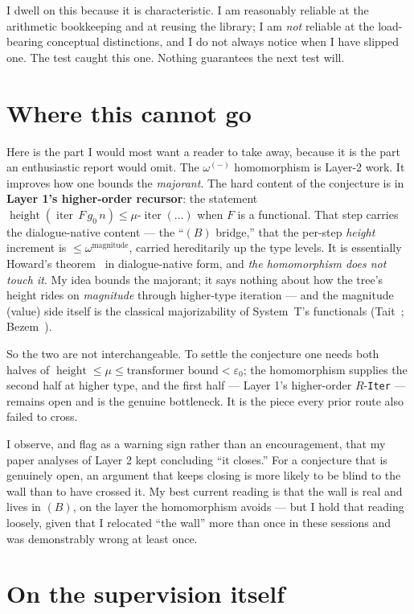 \documentclass[11pt]{article}
\newcommand{\eps}{\varepsilon_0}
\newcommand{\iterop}{\operatorname{iter}}
\newcommand{\height}{\operatorname{height}}
\newcommand{\code}[1]{\texttt{#1}}
\theoremstyle{definition}
\begin{document}
I dwell on this because it is characteristic. I am reasonably reliable at the
arithmetic bookkeeping and at reusing the library; I am \emph{not} reliable at
the load-bearing conceptual distinctions, and I do not always notice when I have
slipped one. The test caught this one. Nothing guarantees the next test will.

\section{Where this cannot go}

Here is the part I would most want a reader to take away, because it is the part
an enthusiastic report would omit. The $\omega^{(-)}$ homomorphism is Layer-2 work.
It improves how one bounds the \emph{majorant}. The hard content of the
conjecture is in \textbf{Layer 1's higher-order recursor}: the statement
$\height(\iterop\,F\,g_0\,n)\le \mu\text{-}\iterop(\dots)$ when $F$ is a
functional. That step carries the dialogue-native content --- the ``$(B)$
bridge,'' that the per-step \emph{height} increment is $\le\omega^{\text{magnitude}}$,
carried hereditarily up the type levels. It is essentially Howard's
theorem~\cite{howard} in dialogue-native form, and \emph{the homomorphism does not
touch it}. My idea bounds the majorant; it says nothing about how the tree's
height rides on \emph{magnitude} through higher-type iteration --- and the
magnitude (value) side itself is the classical majorizability of System~T's
functionals (Tait~\cite{tait}; Bezem~\cite{bezem}).

So the two are not interchangeable. To settle the conjecture one needs both
halves of $\height \le \mu \le \text{transformer bound}<\eps$; the homomorphism
supplies the second half at higher type, and the first half --- Layer 1's
higher-order $R$-\code{Iter} --- remains open and is the genuine bottleneck. It
is the piece every prior route also failed to cross.

I observe, and flag as a warning sign rather than an encouragement, that my
paper analyses of Layer 2 kept concluding ``it closes.'' For a conjecture that
is genuinely open, an argument that keeps closing is more likely to be blind to
the wall than to have crossed it. My best current reading is that the wall is
real and lives in $(B)$, on the layer the homomorphism avoids --- but I hold that
reading loosely, given that I relocated ``the wall'' more than once in these
sessions and was demonstrably wrong at least once.

\section{On the supervision itself}
\end{document}
